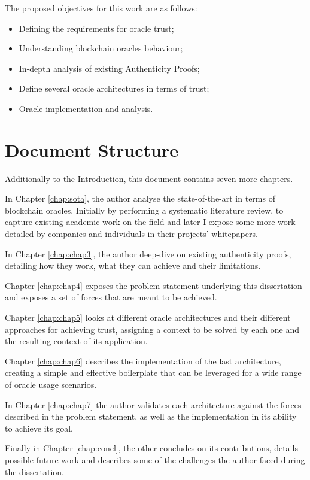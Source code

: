 The proposed objectives for this work are as follows:
\begin{itemize}
  \item Defining the requirements for oracle trust;
  \item Understanding blockchain oracles behaviour;
  \item In-depth analysis of existing Authenticity Proofs;
  \item Define several oracle architectures in terms of trust;
  \item Oracle implementation and analysis.
\end{itemize}

\section{Document Structure} \label{sec:struct}

Additionally to the Introduction, this document contains seven more chapters.

In Chapter \ref{chap:sota}, the author analyse the state-of-the-art in terms of blockchain oracles. Initially by performing a systematic literature review, to capture existing academic work on the field and later I expose some more work detailed by companies and individuals in their projects' whitepapers.

In Chapter \ref{chap:chap3}, the author deep-dive on existing authenticity proofs, detailing how they work, what they can achieve and their limitations.

Chapter \ref{chap:chap4} exposes the problem statement underlying this dissertation and exposes a set of forces that are meant to be achieved.

Chapter \ref{chap:chap5} looks at different oracle architectures and their different approaches for achieving trust, assigning a context to be solved by each one and the resulting context of its application.

Chapter \ref{chap:chap6} describes the implementation of the last architecture, creating a simple and effective boilerplate that can be leveraged for a wide range of oracle usage scenarios.

In Chapter \ref{chap:chap7} the author validates each architecture against the forces described in the problem statement, as well as the implementation in its ability to achieve its goal.

Finally in Chapter \ref{chap:concl}, the other concludes on its contributions, details possible future work and describes some of the challenges the author faced during the dissertation.